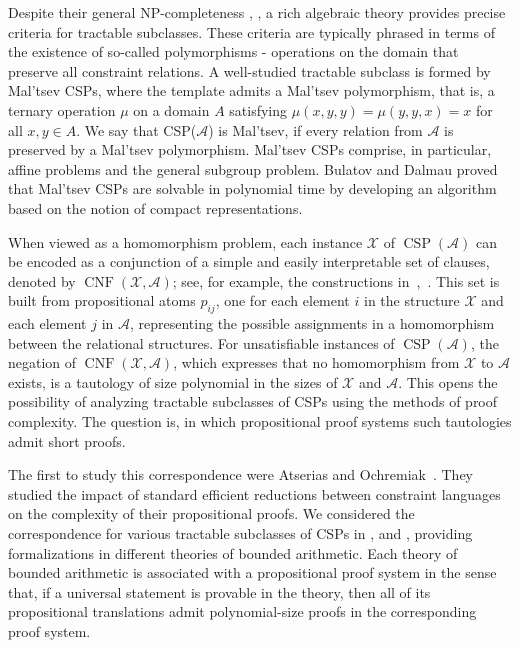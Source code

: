 \documentclass{article}
\theoremstyle{definition}
\theoremstyle{theorem}
\theoremstyle{theorem}
\theoremstyle{remark}
\theoremstyle{remark}
\theoremstyle{example}
\theoremstyle{notation}
\theoremstyle{theorem}
\begin{document}
Despite their general NP-completeness \cite{8104069}, \cite{10.1145/3402029}, a rich algebraic theory provides precise criteria for tractable subclasses. These criteria are typically phrased in terms of the existence of so-called polymorphisms - operations on the domain that preserve all constraint relations. A well-studied tractable subclass is formed by Mal’tsev CSPs, where the template admits a Mal’tsev polymorphism, that is, a ternary operation $\mu$ on a domain $A$ satisfying $\mu(x, y, y) =\mu(y, y, x)= x$ for all $x,y\in A$. We say that CSP($\mathcal{A}$) is Mal'tsev, if every relation from $\mathcal{A}$ is preserved by a Mal'tsev polymorphism. Mal'tsev CSPs comprise, in particular, affine problems and the general subgroup problem. Bulatov and Dalmau \cite{articlestdfh} proved that Mal'tsev CSPs are solvable in polynomial time by developing an algorithm based on the notion of compact representations. 

When viewed as a homomorphism problem, each instance $\mathcal{X}$ of $\operatorname{CSP}(\mathcal{A})$ can be encoded as a conjunction of a simple and easily interpretable set of clauses, denoted by $\operatorname{CNF}(\mathcal{X}, \mathcal{A})$; see, for example, the constructions in~\cite{10.1145/3265985},~\cite{9579073}. This set is built from propositional atoms $p_{ij}$, one for each element $i$ in the structure $\mathcal{X}$ and each element $j$ in $\mathcal{A}$, representing the possible assignments in a homomorphism between the relational structures. For unsatisfiable instances of $\operatorname{CSP}(\mathcal{A})$, the negation of $\operatorname{CNF}(\mathcal{X}, \mathcal{A})$, which expresses that no homomorphism from $\mathcal{X}$ to $\mathcal{A}$ exists, is a tautology of size polynomial in the sizes of $\mathcal{X}$ and $\mathcal{A}$. This opens the possibility of analyzing tractable subclasses of CSPs using the methods of proof complexity. The question is, in which propositional proof systems such tautologies admit short proofs. 

The first to study this correspondence were Atserias and Ochremiak~\cite{10.1145/3265985}. They studied the impact of standard efficient reductions between constraint languages on the complexity of their propositional proofs. We considered the correspondence for various tractable subclasses of CSPs in \cite{9579073}, \cite{gaysin2023proof} and \cite{gaysin2024}, providing formalizations in different theories of bounded arithmetic. Each theory of bounded arithmetic is associated with a propositional proof system in the sense that, if a universal statement is provable in the theory, then all of its propositional translations admit polynomial-size proofs in the corresponding proof system. 
\end{document}
